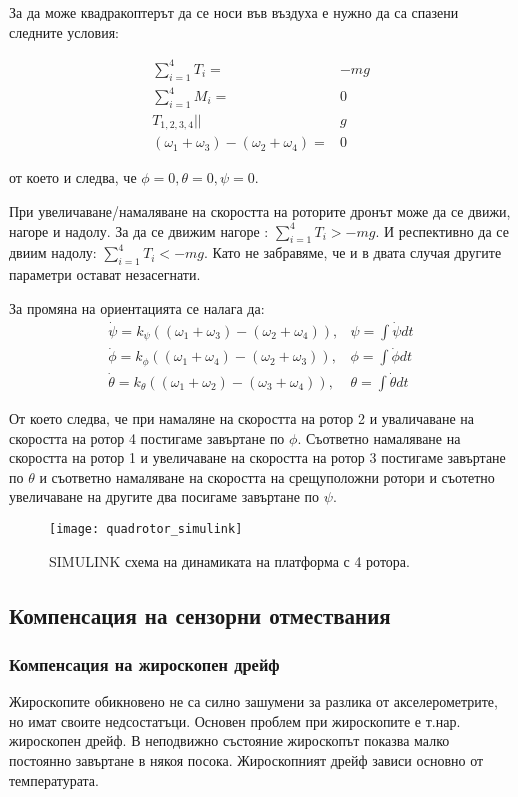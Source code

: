За да може квадракоптерът да се носи във въздуха е нужно да са спазени следните условия:

\begin{align}
		\sum_{i=1}^{4} T_i  =& -mg \\
		\sum_{i=1}^{4} M_i  =& 0 \\
		T_{1,2,3,4} ||& g \\
		( \omega_1 + \omega_3 ) - ( \omega_2 + \omega_4 ) =& 0 
\end{align}

от което и следва, че \(\phi=0,\theta=0,\psi=0\).

При увеличаване/намаляване на скоростта на роторите дронът може да се движи, нагоре и надолу.
За да се движим нагоре : \(\sum_{i=1}^4 T_i > -mg\).
И респективно да се двиим надолу: \(\sum_{i=1}^4 T_i < -mg\). Като не забравяме, 
че и в двата случая другите параметри остават незасегнати.

За промяна на ориентацията се налага да:
\begin{align}
		\dot{\psi} = k_{\psi}((\omega_1+\omega_3)-(\omega_2 + \omega_4)) ,& \psi = \int \dot{\psi}dt\\
		\dot{\phi} = k_{\phi}((\omega_1 + \omega_4) - (\omega_2+\omega_3 )) ,& \phi = \int \dot{\phi}dt\\
		\dot{\theta} = k_{\theta}((\omega_1+\omega_2) - (\omega_3 +\omega_4)) ,& \theta = \int \dot{\theta}dt
\end{align}


От което следва, че при намаляне на скоростта на ротор 2 и уваличаване на скоростта на ротор 4 постигаме
завъртане по \(\phi\). Съответно намаляване на скоростта на ротор 1 и увеличаване на скоростта на ротор 3 
постигаме завъртане по \(\theta\)  и съответно намаляване на скоростта на срещуположни ротори и съотетно увеличаване на другите два посигаме завъртане по \(\psi\).

\begin{figure}[!h]
    \centering
    \texttt{[image: quadrotor\_simulink]}
    \caption{SIMULINK схема на динамиката на платформа с 4 ротора.}
    \label{fig:quadrotor_simulink}
\end{figure}


\FloatBarrier


\subsection{Компенсация на сензорни отмествания}

\subsubsection{Компенсация на жироскопен дрейф}
\FloatBarrier
Жироскопите обикновено не са силно зашумени за разлика от
акселерометрите, но имат своите недсостатъци.
Основен проблем при жироскопите е т.нар. жироскопен дрейф.
В неподвижно състояние жироскопът показва малко постоянно завъртане в някоя посока.
Жироскопният дрейф зависи основно от температурата.


